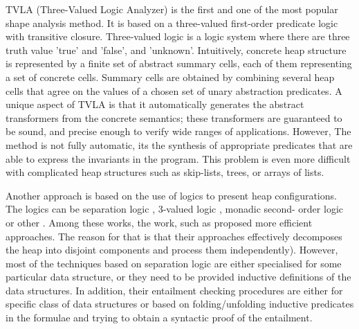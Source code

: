 TVLA (Three-Valued Logic Analyzer) \cite{SagivRW02}  is  the first and one of the most popular shape analysis
method.  It is based on a three-valued first-order predicate logic with transitive closure. Three-valued logic  is a logic system where there are three truth value ’true’ and ’false’, and ’unknown’. Intuitively, concrete heap structure is represented by a finite set of abstract summary cells, each of them representing a set of concrete cells. Summary cells are obtained by combining several heap cells that agree on the values of a chosen set of unary abstraction predicates. 
A unique  aspect of TVLA is that it automatically generates the abstract transformers from the concrete semantics; these transformers are guaranteed to be sound, and precise enough to verify wide ranges of applications. However,
The method is not fully automatic,
 its the synthesis of appropriate predicates that are able to express the invariants in the program. This problem is even more difficult with complicated heap structures such as skip-lists, trees, or arrays of lists.  

Another approach is 
 based on the use of logics to present heap configurations. The logics can be separation logic \cite{John:SL, Stephen:SL,JoshCris:SL,Hongseok:SL,Kamil:SL,Chin:SL,Quang:SL, Ruzica:SL, Constrantin:SL}, 3-valued logic \cite{SagivRW02} , monadic second- order  logic \cite{Ander:ML, Jakob:ML,Madhusudan:ML} or other \cite{Shmuel:Shape, Karen:Shape}. Among these works, the work, such as \cite{JoshCris:SL,Hongseok:SL, Quang:SL} proposed more efficient approaches.  The reason for that is that their approaches effectively decomposes  the heap into disjoint components and process  them independently). However, most of the techniques based on separation logic are either specialised for some particular data structure, or they need to be provided inductive definitions of the data structures. In addition, their entailment checking procedures are either for specific class of data structures or based on folding/unfolding inductive predicates in the formulae and trying to obtain a syntactic proof of the entailment. 

